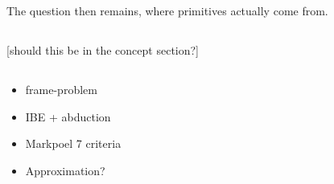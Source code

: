 













The question then remains, where primitives actually come from.
\subsection{}

\subsubsection{}
[should this be in the concept section?]





\subsection{}
\begin{itemize}
    \item frame-problem
    \item IBE + abduction
    \item Markpoel 7 criteria
    \item Approximation?
\end{itemize}

